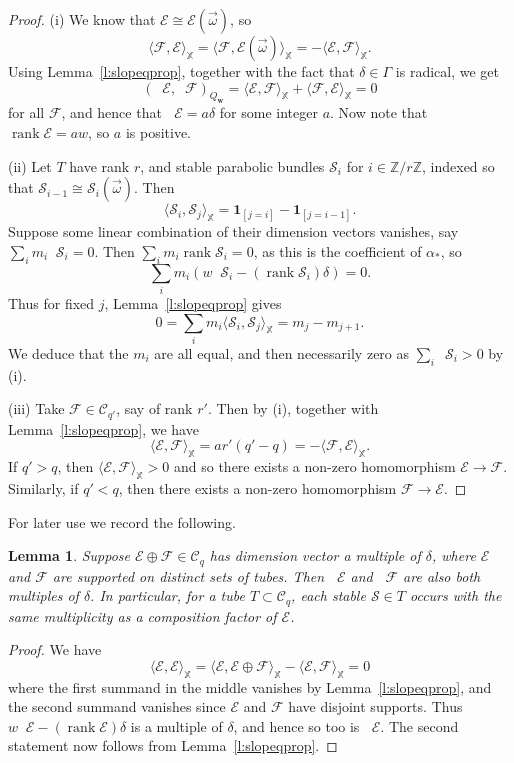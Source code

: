 \documentclass[12pt,a4paper]{amsart}
\theoremstyle{plain}
\newtheorem{lem}[thm]{Lemma}
\newcommand{\Z}{\mathbb Z}
\DeclareMathOperator{\rank}{rank}
\DeclareMathOperator{\dimv}{\underline\dim}
\newcommand{\F}{\mathcal F}
\newcommand{\E}{\mathcal E}
\newcommand{\CC}{\mathcal C}
\newcommand{\XX}{\mathbb X}
\newcommand{\oom}{\vec{\omega}}
\newcommand{\bw}{\mathbf w}
\begin{document}
\begin{proof}
(i) We know that $\E \cong \E(\oom)$, so 
\[
\langle \F,\E\rangle_\XX = \langle \F,\E(\oom)\rangle_\XX = - \langle \E,\F\rangle_\XX.
\]
Using Lemma~\ref{l:slopeqprop}, together with the fact that $\delta\in\Gamma$ is radical, we get
\[ (\dimv\E,\dimv\F)_{Q_\bw} = \langle\E,\F\rangle_\XX + \langle\F,\E\rangle_\XX = 0 \]
for all $\F$, and hence that $\dimv\E=a\delta$ for some integer $a$. Now note that $\rank\E=aw$, so $a$ is positive.

(ii) Let $T$ have rank $r$, and stable parabolic bundles $\mathcal S_i$ for $i\in\Z/r\Z$, indexed so that $\mathcal S_{i-1}\cong\mathcal S_i(\oom)$. Then
\[ \langle\mathcal S_i,\mathcal S_j\rangle_\XX = \mathbf 1_{[j=i]} - \mathbf 1_{[j=i-1]}. \]
Suppose some linear combination of their dimension vectors vanishes, say $\sum_i m_i \dimv \mathcal{S}_i = 0$. Then $\sum_i m_i\rank\mathcal S_i=0$, as this is the coefficient of $\alpha_\ast$, so
\[
\sum_i m_i \left(  w \dimv \mathcal{S}_i - (\rank \mathcal{S}_i) \delta \right) = 0.
\]
Thus for fixed $j$, Lemma~\ref{l:slopeqprop} gives
\[ 0 = \sum_i m_i \langle\mathcal S_i,\mathcal S_j\rangle_\XX = m_j - m_{j+1}. \]
We deduce that the $m_i$ are all equal, and then necessarily zero as $\sum_i\dimv\mathcal S_i>0$ by (i).

(iii) Take $\F\in\CC_{q'}$, say of rank $r'$. Then by (i), together with Lemma~\ref{l:slopeqprop}, we have
\[ \langle\E,\F\rangle_\XX = ar'(q'-q) = -\langle\F,\E\rangle_\XX. \]
If $q'>q$, then $\langle\E,\F\rangle_\XX>0$ and so there exists a non-zero homomorphism $\E\to\F$. Similarly, if $q'<q$, then there exists a non-zero homomorphism $\F\to\E$.
\end{proof}

For later use we record the following.

\begin{lem}
\label{l:dimsdistincttubes}
Suppose $\E\oplus\F\in\CC_q$ has dimension vector a multiple of $\delta$, where $\E$ and $\F$ are supported on distinct sets of tubes. Then $\dimv\E$ and $\dimv\F$ are also both multiples of $\delta$. In particular, for a tube $T\subset\CC_q$, each stable $\mathcal S\in T$ occurs with the same multiplicity as a composition factor of $\E$.
\end{lem}

\begin{proof}
We have
\[ \langle\E,\E\rangle_\XX = \langle\E,\E\oplus\F\rangle_\XX - \langle\E,\F\rangle_\XX = 0 \]
where the first summand in the middle vanishes by Lemma~\ref{l:slopeqprop}, and the second summand vanishes since $\E$ and $\F$ have disjoint supports. Thus $w\dimv\E-(\rank\E)\delta$ is a multiple of $\delta$, and hence so too is $\dimv\E$. The second statement now follows from Lemma~\ref{l:slopeqprop}.  
\end{proof}
\end{document}
